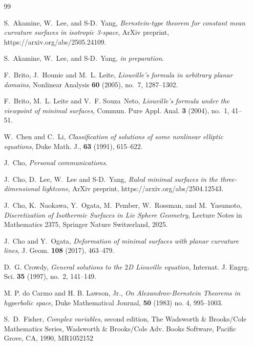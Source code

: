 \documentclass[12pt,reqno]{amsart}
\theoremstyle{plain} %
\theoremstyle{definition}
\numberwithin{equation}{section}
\begin{document}
\begin{thebibliography}{99}

	S.~Akamine, W.~Lee, and S-D.~Yang,
	\emph{Bernstein-type theorem for constant mean curvature surfaces in isotropic 3-space},
	ArXiv preprint, https://arxiv.org/abs/2505.24109.

	S.~Akamine, W.~Lee, and S-D.~Yang,
	\emph{in preparation}.

	F.~Brito, J.~Hounie and M.~L. Leite,
	\emph{Liouville's formula in arbitrary planar domains},
	Nonlinear Analysis \textbf{60} (2005), no.~7, 1287--1302.

	F.~Brito, M.~L. Leite and V.~F. Souza~Neto,
	\emph{Liouville's formula under the viewpoint of minimal surfaces},
	Commun. Pure Appl. Anal. \textbf{3} (2004), no.~1, 41--51.

	W.~Chen and C.~Li,
	\emph{Classification of solutions of some nonlinear elliptic equations},
	Duke Math. J., \textbf{63} (1991), 615--622.

	J.~Cho, \emph{Personal communications}.

	J.~Cho, D.~Lee, W.~Lee and S-D.~Yang,
	\emph{Ruled minimal surfaces in the three-dimensional lightcone},
	ArXiv preprint, https://arxiv.org/abs/2504.12543.

	J.~Cho, K.~Naokawa, Y.~Ogata, M.~Pember, W.~Rossman, and M.~Yasumoto,
	\emph{Discretization of Isothermic  Surfaces in Lie Sphere Geometry},
	Lecture Notes in Mathematics 2375, Springer Nature Switzerland, 2025.

	J.~Cho and Y.~Ogata,
	\emph{Deformation of minimal surfaces with planar curvature lines},
	J. Geom. \textbf{108} (2017), 463--479.

	D.~G. Crowdy,
	\emph{General solutions to the $2$D Liouville equation},
	Internat. J. Engrg. Sci. \textbf{35} (1997), no.~2, 141--149.

	M. P. do Carmo and H. B. Lawson, Jr.,
	\emph{On Alexandrov-Bernstein Theorems in hyperbolic space},
	Duke Mathematical Journal, \textbf{50} (1983) no. 4, 995--1003.

	S.~D.~Fisher,
	\emph{Complex variables}, second edition,
	The Wadsworth \& Brooks/Cole Mathematics Series, Wadsworth \& Brooks/Cole Adv. Books Software, Pacific Grove, CA, 1990, MR1052152


\end{thebibliography}
\end{document}
